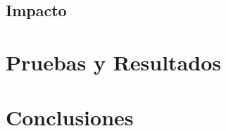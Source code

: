\documentclass{article}
\begin{document}
    \subsection{Impacto}

  \section{Pruebas y Resultados}

  \section{Conclusiones}
\end{document}
